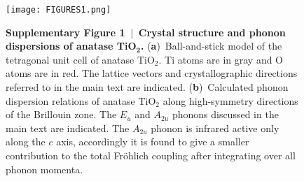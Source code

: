 \documentclass[12pt]{nature-mod}
\begin{document}



 \begin{figure}
 \begin{center}
 \texttt{[image: FIGURES1.png]}
 \end{center}
 \textbf{\bf Supplementary Figure 1 $\,\bm|\,$ Crystal structure and phonon dispersions of anatase 
 TiO$_{\bm2}$.} ({\bf a})~Ball-and-stick model of the tetragonal unit cell of anatase TiO$_2$. Ti 
 atoms are in gray and O atoms are in red. The lattice vectors and crystallographic directions referred
 to in the main text are indicated. ({\bf b})~Calculated phonon dispersion relations of anatase
 TiO$_2$ along high-symmetry directions of the Brillouin zone. The $E_u$ and $A_{2u}$ phonons discussed 
 in the main text are indicated. The $A_{2u}$ phonon is infrared active only along the $c$ axis, 
 accordingly it is found to give a smaller contribution to the total Fr\"ohlich coupling after 
 integrating over all phonon momenta.
 \end{figure}
 
 \clearpage
 
\end{document}
